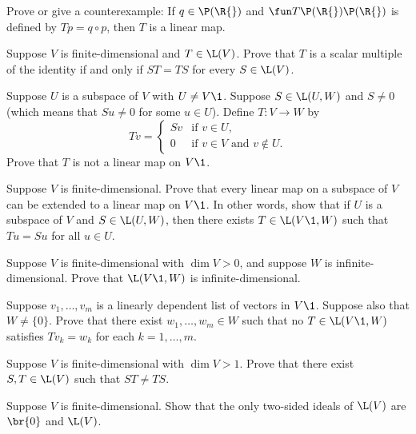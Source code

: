 \pagebreak[3]


\exercise
Prove or give a counterexample: If $q \in \P(\R{})$ and $\fun T {\P(\R{})} {\P(\R{})}$ is defined by $Tp = q \circ p$, then $T$ is a linear map.


\exercise
Suppose $V$ is finite-dimensional and $T \in \L(V)$.  Prove that $T$ is a
scalar multiple of the identity if and  only if $ST = TS$ for every $S \in \L(V)$.


\exercise
Suppose $U$ is a subspace of $V$ with $U \ne V\1$. Suppose $S \in \L(U, W)$ and $S \ne 0$ (which means that $Su \ne 0$ for some $u \in U$). Define $T \colon V \to W$ by
\[
Tv =
\begin{cases}
Sv & \text{if } v \in U,\\
0 & \text{if } v \in V \text{\ and \ }v \notin U.
\end{cases}
\]
Prove that $T$ is not a linear map on $V\1$.


\exercise
Suppose $V$ is finite-dimensional.  Prove that every linear map on a
subspace of $V$ can be extended to a linear map on $V\1$.  In other words, show
that if $U$ is a subspace of $V$ and $S \in \L(U, W)$, then there exists
$T \in \L(V\1, W)$ such that $Tu = Su$ for all $u \in U$.\label{384}


\exercise
Suppose $V$ is finite-dimensional with $\dim V > 0$, and suppose $W$ is infinite-dimensional. Prove that $\L(V\1,W)$ is infinite-dimensional.


\exercise
Suppose $v_1, \dots, v_m$ is a linearly dependent list of vectors in $V\1$. Suppose also that $W \ne \{0\}$. Prove that there exist $w_1, \dots, w_m \in W$ such that no $T \in \L(V\1, W)$ satisfies $Tv_k = w_k$ for each $k = 1, \dots, m$.


\exercise
Suppose $V$ is finite-dimensional with $\dim V > 1$. Prove that there exist $S, T \in \L(V)$ such that $ST \ne TS$. \label{noncomm}


\exercise
Suppose $V$ is finite-dimensional. Show that the only two-sided ideals of $\L(V)$ are $\br{0}$ and $\L(V)$.
\label{ideals}


